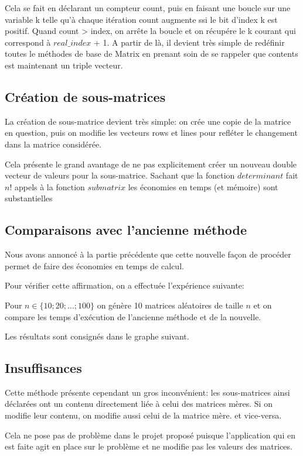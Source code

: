 \documentclass[a4paper,11pt]{article}
\begin{document}
Cela se fait en déclarant un compteur count, puis en faisant une boucle sur une variable k telle qu'à chaque itération count augmente ssi le bit d'index k est positif. Quand count > index, on arrête la boucle
et on récupére le k courant qui correspond à $real\_index$ + 1. 
A partir de là, il devient très simple de redéfinir toutes le méthodes de base de Matrix en prenant soin de se rappeler que contents est maintenant un triple vecteur.

\subsection{Création de sous-matrices}

La création de sous-matrice devient très simple: on crée une copie de la matrice en question, puis on modifie les vecteurs rows et lines pour refléter le changement dans la matrice considérée.

Cela présente le grand avantage de ne pas explicitement créer un nouveau double vecteur de valeurs pour la sous-matrice. Sachant que la fonction $determinant$ fait $n$! appels à la fonction $submatrix$ les économies en temps (et mémoire) sont substantielles


\subsection{Comparaisons avec l'ancienne méthode}

Nous avons annoncé à la partie précédente que cette nouvelle façon de procéder permet de faire des économies en temps de calcul.

Pour vérifier cette affirmation, on a effectuée l'expérience suivante:

Pour $n \in \{10;20;\dots;100\}$ on génère 10 matrices aléatoires de taille $n$ et on compare les temps d'exécution de l'ancienne méthode et de la nouvelle.

Les résultats sont consignés dans le graphe suivant.


\subsection{Insuffisances}

Cette méthode présente cependant un gros inconvénient: les sous-matrices ainsi déclarées ont un contenu directement liée à celui des matrices mères. Si on modifie leur contenu, on modifie aussi celui de la matrice mère. et vice-versa.

Cela ne pose pas de problème dans le projet proposé puisque l'application qui en est faite agit en place sur le problème et ne modifie pas les valeurs des matrices.
\end{document}
